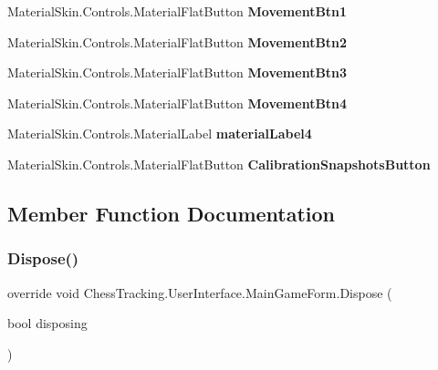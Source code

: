 \begin{DoxyCompactItemize}
Material\+Skin.\+Controls.\+Material\+Flat\+Button {\bfseries Movement\+Btn1}
\item 
\mbox{\label{class_chess_tracking_1_1_user_interface_1_1_main_game_form_a05a78421e39c3c513c21ecbffce1cb1c}} 
Material\+Skin.\+Controls.\+Material\+Flat\+Button {\bfseries Movement\+Btn2}
\item 
\mbox{\label{class_chess_tracking_1_1_user_interface_1_1_main_game_form_a2001fb1cf134ecdca0b1d3d0d6543a29}} 
Material\+Skin.\+Controls.\+Material\+Flat\+Button {\bfseries Movement\+Btn3}
\item 
\mbox{\label{class_chess_tracking_1_1_user_interface_1_1_main_game_form_ac30ed37d8e4e3afbf4a649b8accd984d}} 
Material\+Skin.\+Controls.\+Material\+Flat\+Button {\bfseries Movement\+Btn4}
\item 
\mbox{\label{class_chess_tracking_1_1_user_interface_1_1_main_game_form_a8a8214cc6633a0b3adb61fb35acd413b}} 
Material\+Skin.\+Controls.\+Material\+Label {\bfseries material\+Label4}
\item 
\mbox{\label{class_chess_tracking_1_1_user_interface_1_1_main_game_form_aefd5d18b25432b90474d42ae1fb3f31a}} 
Material\+Skin.\+Controls.\+Material\+Flat\+Button {\bfseries Calibration\+Snapshots\+Button}
\end{DoxyCompactItemize}


\subsection{Member Function Documentation}
\mbox{\label{class_chess_tracking_1_1_user_interface_1_1_main_game_form_a3bf6a16a27b629ec6eed0caab59a93de}} 
\subsubsection{\texorpdfstring{Dispose()}{Dispose()}}
{\footnotesize\ttfamily override void Chess\+Tracking.\+User\+Interface.\+Main\+Game\+Form.\+Dispose (\begin{DoxyParamCaption}\item[{bool}]{disposing }\end{DoxyParamCaption})\hspace{0.3cm}{\ttfamily [protected]}}



